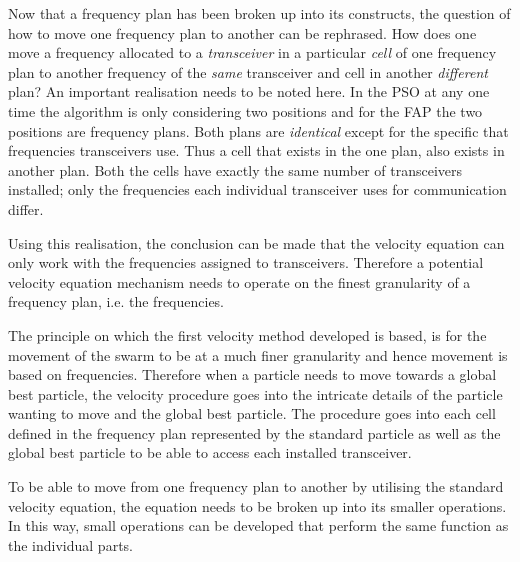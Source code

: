 Now that a frequency plan has been broken up into its constructs, the question of how to move one frequency plan to another can be rephrased. How does one move a frequency allocated to a \emph{transceiver} in a particular \emph{cell} of one frequency plan to another frequency of the \emph{same} transceiver and cell in another \emph{different} plan? An important realisation needs to be noted here. In the PSO at any one time the algorithm is only considering two positions and for the FAP the two positions are frequency plans. Both plans are \emph{identical} except for the specific that frequencies transceivers use. Thus a cell that exists in the one plan, also exists in another plan. Both the cells have exactly the same number of transceivers installed; only the frequencies each individual transceiver uses for communication differ.

Using this realisation, the conclusion can be made that the velocity equation can only work with the frequencies assigned to transceivers. Therefore a potential velocity equation mechanism needs to operate on the finest granularity of a frequency plan, i.e. the frequencies.

The principle on which the first velocity method developed is based, is for the movement of the swarm to be at a much finer granularity and hence movement is based on frequencies. Therefore when a particle needs to move towards a global best particle, the velocity procedure goes into the intricate details of the particle wanting to move and the global best particle. The procedure goes into each cell defined in the frequency plan represented by the standard particle as well as the global best particle to be able to access each installed transceiver.

To be able to move from one frequency plan to another by utilising the standard velocity equation, the equation needs to be broken up into its smaller operations. In this way, small operations can be developed that perform the same function as the individual parts. 

